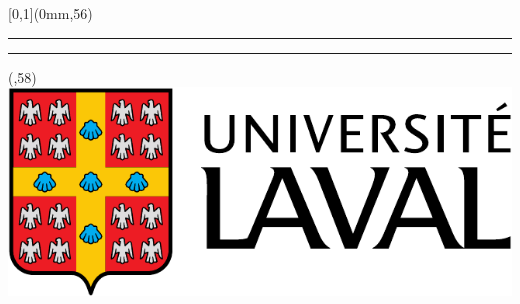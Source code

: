 


\begingroup
{}
\textblockorigin{0mm}{0mm}
\setlength{\parindent}{0mm}
\setlength{\imageheight}{54.9191919\TPVertModule}
\setlength{\logoheight}{4\TPVertModule}
\setlength{\bandeorwidth}{3.203125\logoheight}
\setlength{\banderougewidth}{\paperwidth}
\addtolength{\banderougewidth}{-\bandeorwidth}
\setlength{\bandeorheight}{\TPVertModule}
\setlength{\banderougeheight}{\TPVertModule}
\setlength{\textwidth}{\paperwidth}
\addtolength{\textwidth}{-2\TPHorizModule}

\def\titlefmt{%
  \sffamily\bfseries\fontsize{52}{52}\selectfont\thetitle}
\def\authorfmt{%
  \sffamily\mdseries\fontsize{28}{38}\selectfont\theauthor}
\def\affiliation{%
  \sffamily\mdseries\fontsize{16}{20}\selectfont
  Professeur titulaire \\
  École d'actuariat, Université Laval}
\def\edition{%
  \sffamily\mdseries\fontsize{16}{16}\selectfont
  Édition {\fullcaps\year}.\month}

\begin{textblock*}{\paperwidth}[0,1](0mm,56\TPVertModule)
  \textcolor{rouge}{\rule{\banderougewidth}{\banderougeheight}}%
  \textcolor{or}{\rule{\bandeorwidth}{\bandeorheight}}           %
\end{textblock*}

\begin{textblock*}{\bandeorwidth}(\banderougewidth,58\TPVertModule)
  \includegraphics[height=\logoheight,%
                   keepaspectratio=true]{images/ul_p}
\end{textblock*}

